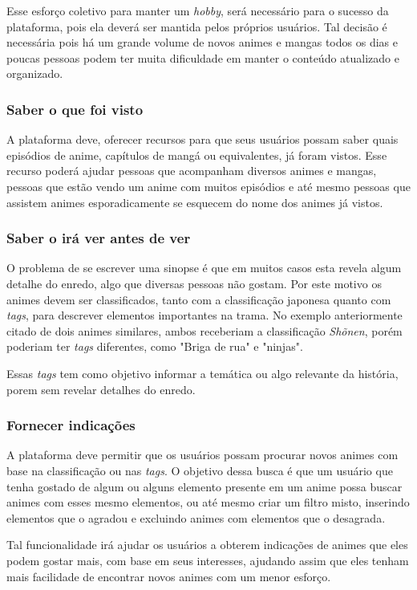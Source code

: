 \documentclass[
	12pt,				%
	openright,			%
	twoside,			%
	a4paper,			%
	Times,
	brazil,				%
	]{abntex2}
\begin{document}
Esse esforço coletivo para manter um \textit{hobby}, será necessário para o sucesso da plataforma, pois ela deverá ser mantida pelos próprios usuários. Tal decisão é necessária pois há um grande volume de novos animes e mangas todos os dias e poucas pessoas podem ter muita dificuldade em manter o conteúdo atualizado e organizado.
\par

\subsubsection{Saber o que foi visto}
A plataforma deve, oferecer recursos para que seus usuários possam saber quais episódios de anime, capítulos de mangá ou equivalentes, já foram vistos. Esse recurso poderá ajudar  pessoas que acompanham diversos animes e mangas, pessoas que estão vendo um anime com muitos episódios e até mesmo pessoas que assistem animes esporadicamente se esquecem do nome dos animes já vistos.
\par

\subsubsection{Saber o irá ver antes de ver}
O problema de se escrever uma sinopse é que em muitos casos esta revela algum detalhe do enredo, algo que diversas pessoas não gostam. Por este motivo os animes devem ser classificados, tanto com a classificação japonesa quanto com \textit{tags}, para descrever elementos importantes na trama. No exemplo anteriormente citado de dois animes similares, ambos receberiam a classificação \textit{Sh\~onen}, porém poderiam ter \textit{tags} diferentes, como "Briga de rua" e "ninjas".
\par
Essas \textit{tags} tem como objetivo informar a temática ou algo relevante da história, porem sem revelar detalhes do enredo.
\par 

\subsubsection{Fornecer indicações}
A plataforma deve permitir que os usuários possam procurar novos animes com base na classificação ou nas  \textit{tags}. O objetivo dessa busca é que um usuário que tenha gostado de algum ou alguns elemento presente em um anime possa buscar animes com esses mesmo elementos, ou até mesmo criar um filtro misto, inserindo elementos que o agradou e excluindo animes com elementos que o desagrada.
\par
Tal funcionalidade irá ajudar os usuários a obterem indicações de animes que eles podem gostar mais, com base em seus interesses, ajudando assim que eles tenham mais facilidade de encontrar novos animes com um menor esforço.
\par
\end{document}
